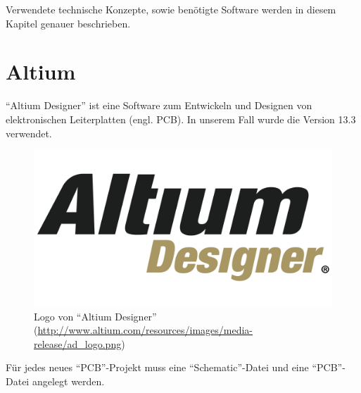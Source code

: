 Verwendete technische Konzepte, sowie benötigte Software werden in diesem Kapitel genauer beschrieben.

\section{Altium}\label{sec:3.1}
\enquote{Altium Designer} ist eine Software zum Entwickeln und Designen von elektronischen Leiterplatten (engl. PCB). In unserem Fall wurde die Version 13.3 verwendet. 
\begin{figure} [h]
	\centering
	\includegraphics[width=1\textwidth]{img/ad_logo.png}
	\caption{Logo von \enquote{Altium Designer} (\url{http://www.altium.com/resources/images/media-release/ad_logo.png})}
	\label{fig:3.1.1}
\end{figure}

Für jedes neues \enquote{PCB}-Projekt muss eine \enquote{Schematic}-Datei und eine \enquote{PCB}-Datei angelegt werden.


